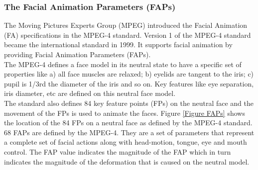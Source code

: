 \documentclass[11pt]{article}
\begin{document}
\subsubsection{The Facial Animation Parameters (FAPs)}
The Moving Pictures Experts Group (MPEG) introduced the Facial Animation (FA) specifications in the MPEG-4 standard. Version 1 of the MPEG-4 standard became the international standard in 1999. It supports facial animation by providing Facial Animation Parameters (FAPs).\\

The MPEG-4 defines a face model in its neutral state to have a specific set of properties like a) all face muscles are relaxed; b) eyelids are tangent to the iris; c) pupil is 1/3rd the diameter of the iris and so on. Key features like eye separation, iris diameter, etc are defined on this neutral face model.\\

The standard also defines 84 key feature points (FPs) on the neutral face and the movement of the FPs is used to animate the faces. Figure \ref{Figure FAPs} shows the location of the 84 FPs on a neutral face as defined by the MPEG-4 standard.\\

68 FAPs are defined by the MPEG-4. They are a set of parameters that represent a complete set of facial actions along with head-motion, tongue, eye and mouth control. The FAP value indicates the magnitude of the FAP which in turn indicates the magnitude of the deformation that is caused on the neutral model.
\end{document}
